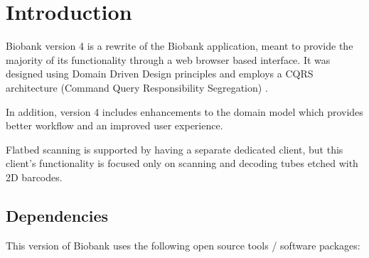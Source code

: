 \chapter{Introduction}

Biobank version 4 is a rewrite of the Biobank application, meant to provide the
majority of its functionality through a web browser based interface. It was
designed using Domain Driven Design principles \cite{evans2004domain} and
employs a CQRS architecture (Command Query Responsibility Segregation)
\cite{vernon2013implementing}.

In addition, version 4 includes enhancements to the domain model which provides
better workflow and an improved user experience.

Flatbed scanning is supported by having a separate dedicated client, but this
client's functionality is focused only on scanning and decoding tubes etched
with 2D barcodes.

\section{Dependencies}

This version of Biobank uses the following open source tools / software packages:

